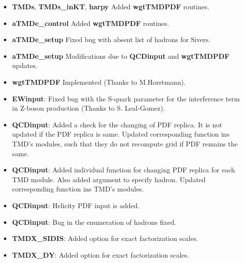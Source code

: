 \documentclass[prd,nofootinbib,eqsecnum,final]{revtex4}
\renewcommand{\(}{\left(}
\renewcommand{\)}{\right)}
\renewcommand{\[}{\left[}
\renewcommand{\]}{\right]}
\begin{document}
\begin{itemize}
\begin{itemize}
	\item \textbf{TMDs}, \textbf{TMDs\_inKT}, \textbf{harpy} Added \textbf{wgtTMDPDF} routines.
	\item \textbf{aTMDe\_control} Added \textbf{wgtTMDPDF} routines.
	\item \textbf{aTMDe\_setup} Fixed bug with absent list of hadrons for Sivers.
	\item \textbf{aTMDe\_setup} Modifications due to \textbf{QCDinput} and \textbf{wgtTMDPDF} updates.
	\item \textbf{wgtTMDPDF} Implemented (Thanks to M.Horstmann).
	\item \textbf{EWinput}: Fixed bug with the S-quark parameter for the interference term in Z-boson production (Thanks to S. Leal-Gomez).
	\item \textbf{QCDinput}: Added a check for the changing of PDF replica. It is not updated if the PDF replica is same. Updated corresponding function ins TMD's modules, such that they do not recompute grid if PDF remains the same.
	\item \textbf{QCDinput}: Added individual function for changing PDF replica for each TMD module. Also added argument to specify hadron. Updated corresponding function ins TMD's modules.
	\item \textbf{QCDinput}: Helicity PDF input is added.
	\item \textbf{QCDinput}: Bug in the enumeration of hadrons fixed.
	\item \textbf{TMDX\_SIDIS}: Added option for exact factorization scales.
	\item \textbf{TMDX\_DY}: Added option for exact factorization scales.
\end{itemize}


\end{itemize}
\end{document}
